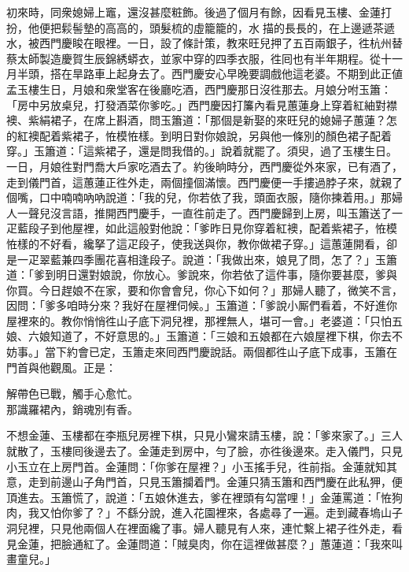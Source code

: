 初來時，同衆媳婦上竈，還沒甚麼粧飾。後過了個月有餘，因看見玉樓、金蓮打扮，他便把鬏髻墊的高高的，頭髮梳的虛籠籠的，水𩬆描的長長的，{}在上邊遞茶遞水，被西門慶睃在眼裡。{}一日，設了條計策，教來旺兒押了五百兩銀子，徃杭州替蔡太師製造慶賀生辰錦綉蟒衣，並家中穿的四季衣服，徃囘也有半年期程。從十一月半頭，搭在旱路車上起身去了。西門慶安心早晚要調戲他這老婆。不期到此正値孟玉樓生日，月娘和衆堂客在後廳吃酒，西門慶那日沒徃那去。月娘分咐玉簫：「房中另放桌兒，打發酒菜你爹吃。」西門慶因打簾內看見蕙蓮身上穿着紅紬對襟襖、紫絹裙子，在席上斟酒，問玉簫道：「那個是新娶的來旺兒的媳婦子蕙蓮？怎的紅襖配着紫裙子，恠模恠樣。{}到明日對你娘說，另與他一條別的顏色裙子配着穿。」玉簫道：「這紫裙子，還是問我借的。」說着就罷了。須臾，過了玉樓生日。一日，月娘徃對門喬大戶家吃酒去了。約後晌時分，西門慶從外來家，已有酒了，走到儀門首，這蕙蓮正徃外走，兩個撞個滿懷。西門慶便一手摟過脖子來，就親了個嘴，口中喃喃吶吶說道：「我的兒，你若依了我，頭面衣服，隨你揀着用。」{}那婦人一聲兒沒言語，推開西門慶手，一直徃前走了。西門慶歸到上房，叫玉簫送了一疋藍段子到他屋裡，如此這般對他說：「爹昨日見你穿着紅襖，配着紫裙子，恠模恠樣的不好看，纔拏了這疋段子，使我送與你，教你做裙子穿。」這蕙蓮開看，卻是一疋翠藍兼四季團花喜相逢段子。說道：「我做出來，娘見了問，怎了？」玉簫道：「爹到明日還對娘說，你放心。爹說來，你若依了這件事，隨你要甚麼，爹與你買。今日趕娘不在家，要和你會會兒，你心下如何？」那婦人聽了，微笑不言，因問：「爹多咱時分來？我好在屋裡伺候。」玉簫道：「爹說小厮們看着，不好進你屋裡來的。教你悄悄徃山子底下洞兒裡，那裡無人，堪可一會。」老婆道：「只怕五娘、六娘知道了，不好意思的。」玉簫道：「三娘和五娘都在六娘屋裡下棋，你去不妨事。」當下約會已定，玉簫走來囘西門慶說話。兩個都徃山子底下成事，玉簫在門首與他觀風。正是：

\begin{myquote} 
解帶色已戰，{}觸手心愈忙。\\
那識羅裙內，銷魂別有香。
\end{myquote} 

不想金蓮、玉樓都在李瓶兒房裡下棋，只見小鸞來請玉樓，說：「爹來家了。」三人就散了，玉樓囘後邊去了。金蓮走到房中，勻了臉，{}亦徃後邊來。走入儀門，只見小玉立在上房門首。金蓮問：「你爹在屋裡？」小玉搖手兒，徃前指。{}金蓮就知其意，走到前邊山子角門首，只見玉簫攔着門。金蓮只猜玉簫和西門慶在此私狎，便頂進去。玉簫慌了，說道：「五娘休進去，爹在裡頭有勾當哩！」金蓮罵道：「恠狗肉，我又怕你爹了？」不繇分說，進入花園裡來，各處尋了一遍。走到藏春塢山子洞兒裡，只見他兩個人在裡面纔了事。婦人聽見有人來，連忙繫上裙子徃外走，看見金蓮，把臉通紅了。金蓮問道：「賊臭肉，你在這裡做甚麼？」蕙蓮道：「我來叫畫童兒。」

